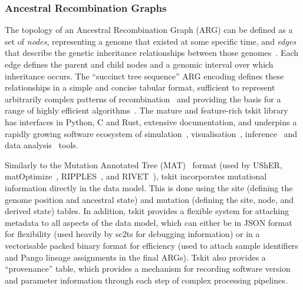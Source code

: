 \documentclass[12pt]{article}
\begin{document}
\subsubsection*{Ancestral Recombination Graphs}
\label{sec:args}
The topology of an Ancestral Recombination Graph (ARG) can be defined
as a set of \emph{nodes}, representing a genome that existed at some specific time,
and \emph{edges} that describe the genetic inheritance relationships between those
genomes~\cite{Wong2024}.
Each edge defines the parent and child nodes and a genomic interval
over which inheritance occurs. The ``succinct tree sequence'' ARG encoding defines
these relationships in a simple and concise tabular format,
sufficient to represent arbitrarily complex patterns of
recombination~\cite{Wong2024} and providing the basis for a range of highly
efficient
algorithms~\cite{Kelleher2016,Ralph2020,Kelleher2020coalescent,
Grundler2025geographic,Lehmann2025args}.
The mature and feature-rich tskit library has interfaces in Python, C and Rust,
extensive documentation,
and underpins a rapidly growing software ecosystem of
simulation~\cite{Baumdicker2022,Haller2019,Petr2023,Tsambos2023link,Tagami2024tstrait,Gopalan2025bridging},
visualisation~\cite{Karthikeyan2025tsbrowse,Kitchens2025tskit,Talbot2025argscape},
inference~\cite{Kelleher2019,Wohns2022,Mahmoudi2022,Martin2025model,Pieszko2025detecting,
Pope2025}
and data
analysis~\cite{Fan2022,Nowbandegani2023extremely,Fritze2024forest,Lee2025genetic}
tools.

Similarly to the Mutation Annotated Tree (MAT)~\cite{McBroome2021} format
(used by
UShER\cite{Turakhia2021},
matOptimize~\cite{DeMaio2023},
RIPPLES~\cite{Turakhia2022}, and
RIVET~\cite{Smith2023tracking}),
tskit incorporates mutational information directly in the data model.
This is done using
the site (defining the genome position and ancestral state) and
mutation (defining the site, node, and derived state)
tables.
In addition, tskit provides a flexible system for attaching metadata
to all aspects of the data model, which can either be in JSON format
for flexibility (used heavily by sc2ts for debugging information)
or in a vectorisable packed binary format for efficiency
(used to attach sample identifiers and Pango lineage assignments in the final ARGs).
Tskit also provides a ``provenance'' table,
which provides a mechanism for recording software version and
parameter information through each step of complex processing pipelines.
\end{document}
